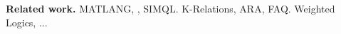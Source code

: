 %
%


\medskip
\noindent
\textbf{Related work.} 
 MATLANG, \lara, SIMQL.
K-Relations, ARA, FAQ.
 Weighted Logics, ...

